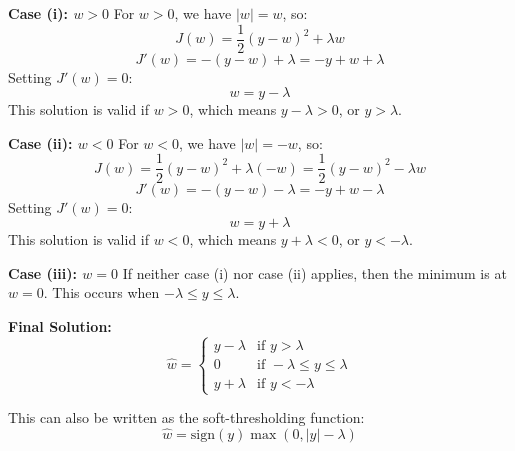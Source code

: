 \documentclass[11pt]{article}
\begin{document}
\begin{enumerate}
\textbf{Case (i): $w > 0$}
For $w > 0$, we have $|w| = w$, so:
\[
J(w) = \frac{1}{2}(y-w)^2 + \lambda w
\]
\[
J'(w) = -(y-w) + \lambda = -y + w + \lambda
\]
Setting $J'(w) = 0$:
\[
w = y - \lambda
\]
This solution is valid if $w > 0$, which means $y - \lambda > 0$, or $y > \lambda$.

\textbf{Case (ii): $w < 0$}
For $w < 0$, we have $|w| = -w$, so:
\[
J(w) = \frac{1}{2}(y-w)^2 + \lambda(-w) = \frac{1}{2}(y-w)^2 - \lambda w
\]
\[
J'(w) = -(y-w) - \lambda = -y + w - \lambda
\]
Setting $J'(w) = 0$:
\[
w = y + \lambda
\]
This solution is valid if $w < 0$, which means $y + \lambda < 0$, or $y < -\lambda$.

\textbf{Case (iii): $w = 0$}
If neither case (i) nor case (ii) applies, then the minimum is at $w = 0$. This occurs when $-\lambda \leq y \leq \lambda$.

\textbf{Final Solution:}
\[
\widehat{w} = \begin{cases}
y - \lambda & \text{if } y > \lambda \\
0 & \text{if } -\lambda \leq y \leq \lambda \\
y + \lambda & \text{if } y < -\lambda
\end{cases}
\]

This can also be written as the soft-thresholding function:
\[
\widehat{w} = \text{sign}(y) \max(0, |y| - \lambda)
\]

\end{enumerate}
\end{document}
